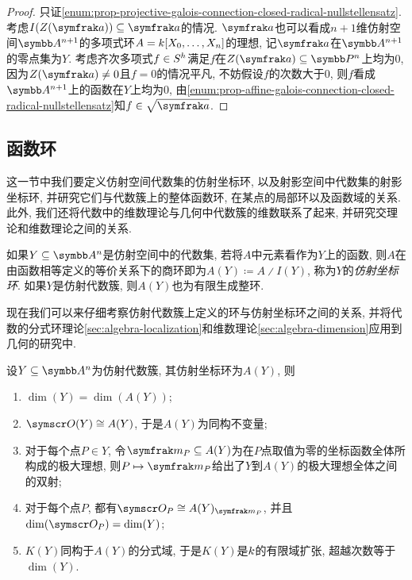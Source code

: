\begin{proof}
  只证\ref{enum:prop-projective-galois-connection-closed-radical-nullstellensatz}. 考虑$I(Z(\ideal{a}))\subseteq\ideal{a}$的情况. $\ideal{a}$也可以看成$n+1$维仿射空间$\AF^{n+1}$的多项式环$A=k [X_0, \dotsc, X_n]$的理想, 记$\ideal{a}$在$\AF^{n+1}$的零点集为$Y$. 考虑齐次多项式$f\in S^h$满足$f$在$Z(\ideal{a})\subseteq \PP^n$上均为0, 因为$Z(\ideal{a})\neq 0$且$f=0$的情况平凡, 不妨假设$f$的次数大于0, 则$f$看成$\AF^{n+1}$上的函数在$Y$上均为0, 由\ref{enum:prop-affine-galois-connection-closed-radical-nullstellensatz}知$f\in\sqrt{\ideal{a}}$.
\end{proof}

\subsection{函数环}\label{sec:ag-functionrings}

这一节中我们要定义仿射空间代数集的仿射坐标环, 以及射影空间中代数集的射影坐标环, 并研究它们与代数簇上的整体函数环, 在某点的局部环以及函数域的关系. 此外, 我们还将代数中的维数理论与几何中代数簇的维数联系了起来, 并研究交理论和维数理论之间的关系.

如果$Y\subseteq \AF^n$是仿射空间中的代数集, 若将$A$中元素看作为$Y$上的函数, 则$A$在由函数相等定义的等价关系下的商环即为$A(Y)\coloneq A{\divslash}I(Y)$, 称为$Y$的\emph{仿射坐标环}. 如果$Y$是仿射代数簇, 则$A(Y)$也为有限生成整环.

现在我们可以来仔细考察仿射代数簇上定义的环与仿射坐标环之间的关系, 并将代数的分式环理论\ref{sec:algebra-localization}和维数理论\ref{sec:algebra-dimension}应用到几何的研究中.

\begin{theorem}\label{thm:affinerings}
  设$Y\subseteq \AF^n$为仿射代数簇, 其仿射坐标环为$A(Y)$, 则
  \begin{enumerate}
    \item\label{enum:thm-affine-rings-1} $\dim (Y)=\dim (A(Y))$;
    \item\label{enum:thm-affine-rings-2} $\OO (Y)\cong A(Y)$, 于是$A(Y)$为同构不变量;
    \item\label{enum:thm-affine-rings-3} 对于每个点$P\in Y$, 令$\ideal{m}_P\subseteq A(Y)$为在$P$点取值为零的坐标函数全体所构成的极大理想, 则$P\mapsto \ideal{m}_P$给出了$Y$到$A(Y)$的极大理想全体之间的双射;
    \item\label{enum:thm-affine-rings-4} 对于每个点$P$, 都有$\OO_P\cong A(Y)_{\ideal{m}_P}$, 并且$\dim (\OO_P)=\dim (Y)$;
    \item\label{enum:thm-affine-rings-5} $K(Y)$同构于$A(Y)$的分式域, 于是$K(Y)$是$k$的有限域扩张, 超越次数等于$\dim (Y)$.
  \end{enumerate}
\end{theorem}

